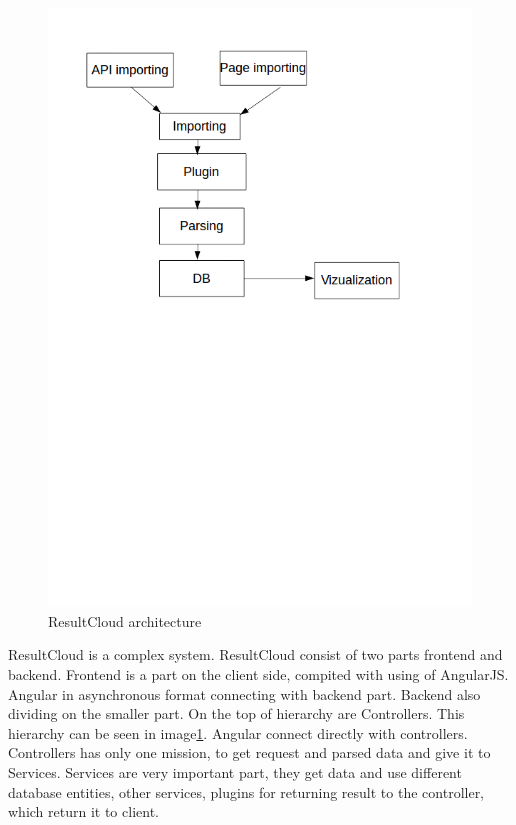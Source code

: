 \begin{figure}
  \centering
    \includegraphics[trim=0 13.41cm 0 0,scale=0.5]{fig/result-cloud.png}
  \caption{ResultCloud architecture}
  \label{fig:result_cloud}
\end{figure}

ResultCloud is a complex system. ResultCloud consist of two parts frontend and backend. Frontend is a part on the client side, compited with using of AngularJS. Angular in asynchronous format connecting with backend part. Backend also dividing on the smaller part. On the top of hierarchy are Controllers. This hierarchy can be seen in image\ref{fig:result_cloud}. Angular connect directly with controllers. Controllers has only one mission, to get request and parsed data and give it to Services. Services are very important part, they get data and use different database entities, other services, plugins for returning result to the controller, which return it to client. 

